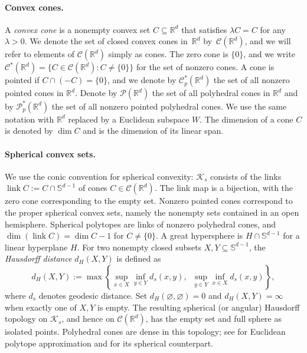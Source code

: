 \documentclass[11pt]{article}
\newcommand{\R}{\mathbb{R}}
\newcommand{\CC}{\mathcal{C}}
\newcommand{\PP}{\mathcal{P}}
\newcommand{\sphere}[1]{\mathbb{S}^{#1}}
\newcommand{\vct}[1]{#1}
\newcommand{\zero}{\vct{0}}
\newcommand{\link}{\operatorname{link}}
\theoremstyle{plain}
\theoremstyle{definition}
\begin{document}
\paragraph{Convex cones.} A \emph{convex cone} is a nonempty convex set $C\subseteq\R^d$ that satisfies $\lambda C=C$ for any $\lambda>0$. We denote the set of closed convex cones in~$\R^d$ by~$\CC(\R^d)$, and we will refer to elements of $\CC(\R^d)$ simply as cones. The zero cone is $\{\zero\}$, and we write $\CC^*(\R^d)=\{C\in\CC(\R^d)\colon C\ne\{\zero\}\}$ for the set of nonzero cones.
A cone is pointed if $C\cap (-C)=\{\zero\}$, and we denote by $\CC_p^*(\R^d)$ the set of all nonzero pointed cones in $\R^d$. Denote by $\PP(\R^d)$ the set of all polyhedral cones in $\R^d$ and by $\PP_p^*(\R^d)$ the set of all nonzero pointed polyhedral cones.
We use the same notation with $\R^d$ replaced by a Euclidean subspace $W$. The dimension of a cone $C$ is denoted by $\dim C$ and is the dimension of its linear span.

\paragraph{Spherical convex sets.} We use the conic convention for
spherical convexity: $\mathcal K_s$ consists of the links
$\link C:=C\cap\sphere{d-1}$ of cones $C\in\CC(\R^d)$.
The link map is a bijection, with the zero cone corresponding to the
empty set.  Nonzero pointed cones correspond to the proper spherical
convex sets, namely the nonempty sets contained in an open hemisphere.
Spherical polytopes are links of nonzero polyhedral cones, and
$\dim(\link C)=\dim C-1$ for $C\ne\{\zero\}$.
A great hypersphere is $H\cap\sphere{d-1}$ for a linear hyperplane $H$.
For two nonempty closed subsets $X,Y\subseteq \sphere{d-1}$, the {\em Hausdorff distance} $d_H(X,Y)$ is defined as
\begin{equation*}
d_H(X,Y) := \max\left\{ \sup_{\vct{x}\in X} \inf_{\vct{y}\in Y} d_s(\vct{x},\vct{y}),\;\; \sup_{\vct{y}\in Y} \inf_{\vct{x}\in X} d_s(\vct{x},\vct{y}) \right\},
\end{equation*}
where $d_s$ denotes geodesic distance.  Set
$d_H(\varnothing,\varnothing)=0$ and $d_H(X,Y)=\infty$ when exactly one
of $X,Y$ is empty.  The resulting spherical (or angular) Hausdorff topology on
$\mathcal K_s$, and hence on $\CC(\R^d)$, has the empty set and full
sphere as isolated points.  Polyhedral cones are dense in this topology;
see \cite[Section~1.8]{Sch14:Convex-Bodies} for Euclidean polytope
approximation and \cite[Chapter~3]{Sch22:Convex-Cones} for its spherical
counterpart.
\end{document}
